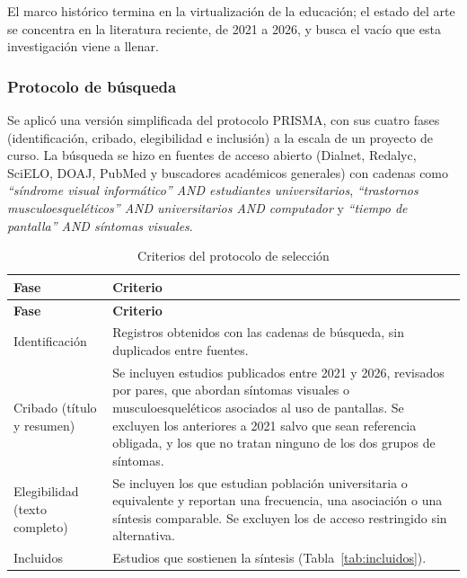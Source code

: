 El marco histórico termina en la virtualización de la educación; el estado del arte se
concentra en la literatura reciente, de 2021 a 2026, y busca el vacío que esta
investigación viene a llenar.

\subsubsection*{Protocolo de búsqueda}

Se aplicó una versión simplificada del protocolo PRISMA, con sus cuatro fases
(identificación, cribado, elegibilidad e inclusión) a la escala de un proyecto de
curso. La búsqueda se hizo en fuentes de acceso abierto (Dialnet, Redalyc, SciELO, DOAJ,
PubMed y buscadores académicos generales) con cadenas como \emph{``síndrome visual
informático'' AND estudiantes universitarios}, \emph{``trastornos musculoesqueléticos''
AND universitarios AND computador} y \emph{``tiempo de pantalla'' AND síntomas
visuales}.

\bigskip
\begin{center}
\small
\begin{longtable}{L{3cm} L{11.8cm}}
\caption{Criterios del protocolo de selección} \\
\toprule
\textbf{Fase} & \textbf{Criterio} \\
\midrule
\endfirsthead
\toprule
\textbf{Fase} & \textbf{Criterio} \\
\midrule
\endhead
Identificación & Registros obtenidos con las cadenas de búsqueda, sin duplicados entre fuentes. \\
\midrule
Cribado (título y resumen) & Se incluyen estudios publicados entre 2021 y 2026, revisados por pares, que abordan síntomas visuales o musculoesqueléticos asociados al uso de pantallas. Se excluyen los anteriores a 2021 salvo que sean referencia obligada, y los que no tratan ninguno de los dos grupos de síntomas. \\
\midrule
Elegibilidad (texto completo) & Se incluyen los que estudian población universitaria o equivalente y reportan una frecuencia, una asociación o una síntesis comparable. Se excluyen los de acceso restringido sin alternativa. \\
\midrule
Incluidos & Estudios que sostienen la síntesis (Tabla~\ref{tab:incluidos}). \\
\bottomrule
\end{longtable}
\end{center}


